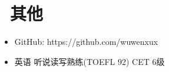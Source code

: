 \documentclass{resume}
\begin{document}
\section{\faInfo\ 其他}
\begin{itemize}[parsep=0.5ex]
  \item GitHub: https://github.com/wuwenxux
  \item 英语  听说读写熟练(TOEFL 92) CET 6级
\end{itemize}

%
%
\end{document}
